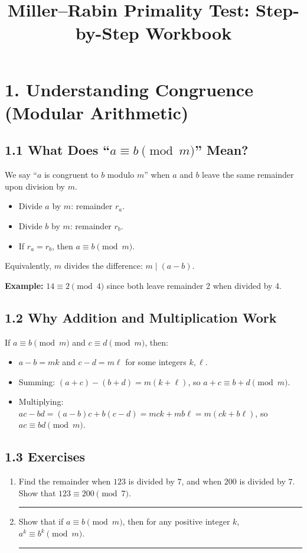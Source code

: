 \documentclass[12pt]{article}
\title{Miller--Rabin Primality Test: Step-by-Step Workbook}
\author{}
\date{}
\begin{document}
\maketitle

\section{1. Understanding Congruence (Modular Arithmetic)}
\subsection{1.1 What Does ``$a \equiv b \pmod m$'' Mean?}
We say ``$a$ is congruent to $b$ modulo $m$'' when $a$ and $b$ leave the same remainder upon division by $m$.
\begin{itemize}
  \item Divide $a$ by $m$: remainder $r_a$.
  \item Divide $b$ by $m$: remainder $r_b$.
  \item If $r_a = r_b$, then $a \equiv b \pmod m$.
\end{itemize}
Equivalently, $m$ divides the difference: \quad $m \mid (a - b)$.

\textbf{Example:} $14 \equiv 2 \pmod{4}$ since both leave remainder 2 when divided by 4.

\subsection{1.2 Why Addition and Multiplication Work}
If $a \equiv b\pmod m$ and $c \equiv d\pmod m$, then:
\begin{itemize}
  \item $a - b = m k$ and $c - d = m \ell$ for some integers $k,\ell$.
  \item Summing: $(a + c) - (b + d) = m(k + \ell)$, so $a + c \equiv b + d\pmod m$.
  \item Multiplying: $ac - bd = (a - b)c + b(c - d) = mc k + m b \ell = m(ck + b\ell)$, so $ac \equiv bd\pmod m$.
\end{itemize}

\subsection{1.3 Exercises}
\begin{enumerate}[label=Exercise 1.\arabic*]
  \item Find the remainder when $123$ is divided by $7$, and when $200$ is divided by $7$. Show that $123 \equiv 200\pmod7$.\rule{4cm}{0.4pt}
  \item Show that if $a\equiv b\pmod m$, then for any positive integer $k$, $a^k \equiv b^k\pmod m$.\rule{4cm}{0.4pt}
\end{enumerate}
\end{document}
